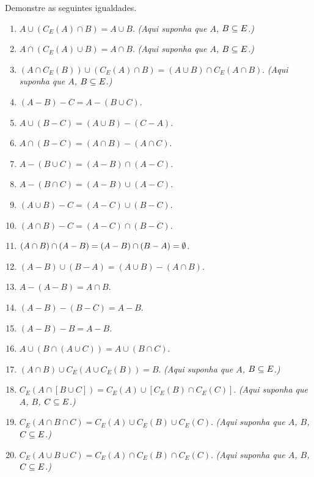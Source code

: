 \documentclass[12pt]{exam}
\begin{document}
    \questao{} Demonstre as seguintes igualdades.
    \begin{enumerate}[label={\alph*})]
        \item $A \cup (C_E(A) \cap B) = A \cup B$. \textit{(Aqui suponha que $A$, $B \subseteq E$.)}

        \item $A \cap (C_E(A) \cup B) = A \cap B$. \textit{(Aqui suponha que $A$, $B \subseteq E$.)}

        \item $(A \cap C_E(B)) \cup (C_E(A) \cap B) = (A \cup B) \cap C_E(A \cap B)$. \textit{(Aqui suponha que $A$, $B \subseteq E$.)}
        \item $(A - B) - C = A - (B \cup C)$.

        \item $A \cup (B - C) = (A \cup B) - (C - A)$.

        \item $A \cap (B - C) = (A \cap B) - (A \cap C)$.

        \item $A - (B \cup C) = (A - B) \cap (A - C)$.

        \item $A - (B \cap C) = (A - B) \cup (A - C)$.

        \item $(A \cup B) - C = (A - C) \cup (B - C)$.

        \item $(A \cap B) - C = (A - C) \cap (B - C)$.

        \item $(A \cap B) \cap (A - B) = (A - B) \cap (B - A) = \emptyset$.

        \item $(A - B) \cup (B - A) = (A \cup B) - (A \cap B)$.

        \item $A - (A - B) = A \cap B$.

        \item $(A - B) - (B - C) = A - B$.

        \item $(A - B) - B = A - B$.

        \item $A \cup (B \cap (A \cup C)) = A \cup (B \cap C)$.

        \item $(A \cap B) \cup C_E(A \cup C_E(B)) = B$. \textit{(Aqui suponha que $A$, $B \subseteq E$.)}

        \item $C_E( A \cap [B \cup C]) = C_E(A) \cup [C_E(B)\cap C_E(C)]$. \textit{(Aqui suponha que $A$, $B$, $C \subseteq E$.)}

        \item $C_E( A \cap B \cap C) = C_E(A) \cup C_E(B) \cup C_E(C)$. \textit{(Aqui suponha que $A$, $B$, $C \subseteq E$.)}

        \item $C_E( A \cup B \cup C) = C_E(A) \cap C_E(B) \cap C_E(C)$. \textit{(Aqui suponha que $A$, $B$, $C \subseteq E$.)}
    \end{enumerate}
\end{document}
